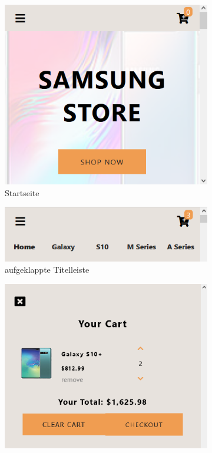 \begin{figure}
    \centering
    \begin{subfigure}[b]{0.3\textwidth}
        \centering
        \includegraphics[width=\textwidth]{pictures/Start.png}
        \caption{Startseite}
        \label{fig:online-shopping-website-start}
    \end{subfigure}
    \hfill
    \begin{subfigure}[b]{0.3\textwidth}
        \centering
        \includegraphics[width=\textwidth]{pictures/Leiste.png}
        \caption{auf\-ge\-klappte Titelleiste}
        \label{fig:online-shopping-website-menu}
    \end{subfigure}
    \hfill
    \begin{subfigure}[b]{0.3\textwidth}
        \centering
        \includegraphics[width=\textwidth]{pictures/Cart.png}

\end{subfigure}
\end{figure}
